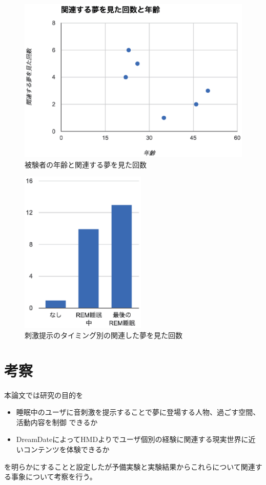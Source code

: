 \begin{figure}[htbp]
\begin{center}
\includegraphics[width=12cm]{eps/age.eps}
\caption{被験者の年齢と関連する夢を見た回数}
\label{age}
\end{center}
\end{figure}

\begin{figure}[htbp]
\begin{center}
\includegraphics[width=6cm]{eps/result.eps}
\caption{刺激提示のタイミング別の関連した夢を見た回数}
\label{result}
\end{center}
\end{figure}

\section{考察}  
本論文では研究の目的を
\begin{itemize}
\item 睡眠中のユーザに音刺激を提示することで夢に登場する人物、過ごす空間、活動内容を制御 できるか
\item DreamDateによってHMDよりでユーザ個別の経験に関連する現実世界に近いコンテンツを体験できるか
\end{itemize}
を明らかにすることと設定したが予備実験と実験結果からこれらについて関連する事象について考察を行う。

